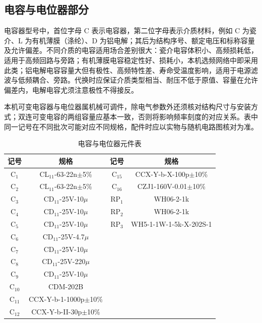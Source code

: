 \documentclass[12pt,UTF8]{ctexbook}
\begin{document}
	\subsection{电容与电位器部分}
	
	电容器型号中，首位字母 C 表示电容器，第二位字母表示介质材料，例如 C 为瓷介、L 为有机薄膜（涤纶）、D 为铝电解；其后为结构序号、额定电压和标称容量及允许偏差。不同介质的电容适用场合差别很大：瓷介电容体积小、高频损耗低，适用于高频回路与旁路；有机薄膜电容稳定性好、损耗小，本机选频网络中即采用此类；铝电解电容容量大但有极性、高频特性差、寿命受温度影响，适用于电源滤波与低频耦合、旁路。代换时应保证介质类型相当、耐压不低于原值、容量在允许偏差内，电解电容尤须注意极性不得接反。
	
	本机可变电容器与电位器属机械可调件，除电气参数外还须核对结构尺寸与安装方式；双连可变电容的两组容量应基本一致，否则将影响频率刻度的对应关系。表中同一记号在不同批次可能对应不同规格，配件时应以实物与随机电路图核对为准。
	
	\begin{table}[H]
		\centering
		\small
		\setlength{\tabcolsep}{4pt}
		\caption{电容与电位器元件表}
		\begin{tabular}{|c|c||c|c|}
			\hline
			\textbf{记号} & \textbf{规格} & \textbf{记号} & \textbf{规格} \\ \hline
			C\(_1\) & CL\(_{11}\)-63-22n\(\pm\)5\% & C\(_{15}\) & CCX-Y-b-X-100p\(\pm\)10\% \\ \hline
			C\(_2\) & CL\(_{11}\)-63-22n\(\pm\)5\% & C\(_{16}\) & CZJ1-160V-0.01\(\pm\)10\% \\ \hline
			C\(_3\) & CD\(_{11}\)-25V-10\(\mu\) & RP\(_1\) & WH06-2-1k \\ \hline
			C\(_4\) & CD\(_{11}\)-25V-10\(\mu\) & RP\(_2\) & WH06-2-1k \\ \hline
			C\(_5\) & CD\(_{11}\)-25V-10\(\mu\) & RP\(_3\) & WH5-1-1W-1-5k-X-202S-1 \\ \hline
			C\(_6\) & CD\(_{11}\)-25V-4.7\(\mu\) & & \\ \hline
			C\(_7\) & CD\(_{11}\)-25V-10\(\mu\) & & \\ \hline
			C\(_8\) & CD\(_{11}\)-25V-220\(\mu\) & & \\ \hline
			C\(_9\) & CD\(_{11}\)-25V-10\(\mu\) & & \\ \hline
			C\(_{10}\) & CDM-202B & & \\ \hline
			C\(_{11}\) & CCX-Y-b-1-1000p\(\pm\)10\% & & \\ \hline
			C\(_{12}\) & CCX-Y-b-II-30p\(\pm\)10\% & & \\ \hline
		\end{tabular}
	\end{table}

\backmatter
\end{document}
